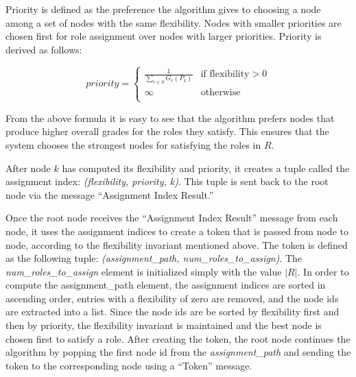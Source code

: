 \documentclass[11pt]{article}
\begin{document}
\begin{multicols}{2}
Priority is defined as the preference the algorithm gives to choosing a node among a set of nodes with the same flexibility. Nodes with smaller priorities are chosen first for role assignment over nodes with larger priorities. Priority is derived as follows:

\begin{equation*}
     priority = \begin{cases}
               \frac{1}{\sum_{r \in S }G_{r}(P_{k}) }               & \text{if flexibility} > 0\\
               \infty               & \text{otherwise}\\
           \end{cases}
\end{equation*}

From the above formula it is easy to see that the algorithm prefers nodes that produce higher overall grades for the roles they satisfy. This ensures that the system chooses the strongest nodes for satisfying the roles in $R$.

After node $k$ has computed its flexibility and priority, it creates a tuple called the assignment index: \textit{(flexibility, priority, k)}. This tuple is sent back to the root node via the message ``Assignment Index Result.''

Once the root node receives the ``Assignment Index Result'' message from each node, it uses the assignment indices to create a token that is passed from node to node, according to the flexibility invariant mentioned above. The token is defined as the following tuple: \textit{(assignment\_path, num\_roles\_to\_assign)}. The \textit{num\_roles\_to\_assign} element is initialized simply with the value $|R|$. In order to compute the assignment\_path element, the assignment indices are sorted in ascending order, entries with a flexibility of zero are removed, and the node ids are extracted into a list. Since the node ids are be sorted by flexibility first and then by priority, the flexibility invariant is maintained and the best node is chosen first to satisfy a role. After creating the token, the root node continues the algorithm by popping the first node id from the \textit{assignment\_path} and sending the token to the corresponding node using a ``Token'' message.


\end{multicols}
\end{document}
